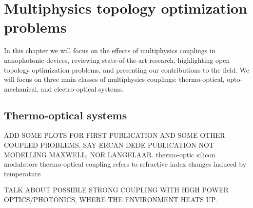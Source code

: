 \chapter{Multiphysics topology optimization problems}

In this chapter we will focus on the effects of multiphysics couplings in nanophotonic devices, reviewing state-of-the-art research, 
highlighting open topology optimization problems, and presenting our contributions to the field.
We will focus on three main classes of multiphysics couplings: thermo-optical, opto-mechanical, and electro-optical systems.








\section{Thermo-optical systems~\cite{ownpub0,ownpub4}}

ADD SOME PLOTS FOR FIRST PUBLICATION AND SOME OTHER COUPLED PROBLEMS.
SAY ERCAN DEDE PUBLICATION NOT MODELLING MAXWELL, NOR LANGELAAR. %
thermo-optic silicon modulators
thermo-optical coupling refers to refractive index changes induced by temperature

TALK ABOUT POSSIBLE STRONG COUPLING WITH HIGH POWER OPTICS/PHOTONICS, WHERE THE ENVIRONMENT HEATS UP.

